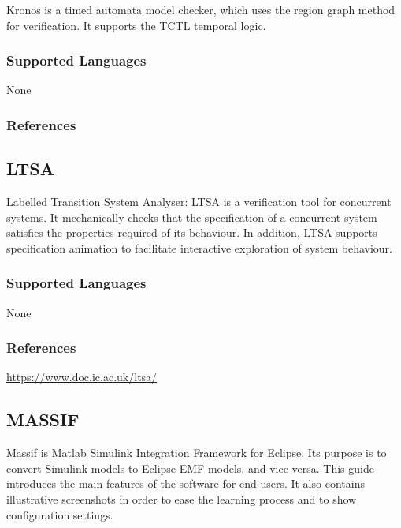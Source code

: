 Kronos is a timed automata model checker, which uses the region graph method for verification.
It supports the TCTL temporal logic.

\subsubsection{Supported Languages}

None


\subsubsection{References}





\subsection{LTSA}
\label{subsecT:LTSA}


Labelled Transition System Analyser:
LTSA is a verification tool for concurrent systems. It mechanically checks that the specification of a concurrent system satisfies the properties required of its behaviour. In addition, LTSA supports specification animation to facilitate interactive exploration of system behaviour.

\subsubsection{Supported Languages}

None


\subsubsection{References}

\url{https://www.doc.ic.ac.uk/ltsa/}




\subsection{MASSIF}
\label{subsecT:MASSIF}

Massif is Matlab Simulink Integration Framework for Eclipse. Its purpose is to convert Simulink models to Eclipse-EMF models, and vice versa. This guide introduces the main features of the software for end-users. It also contains illustrative screenshots in order to ease the learning process and to show configuration settings.

